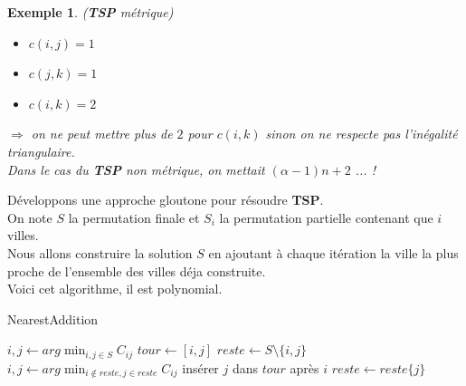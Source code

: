 \documentclass{article}
\newcommand{\titre}[1]{\textcolor{title}{#1}}
\newtheorem{exemple}{Exemple}[section]
\begin{document}
\begin{sffamily}
\begin{exemple}(\textbf{\titre{TSP}} métrique)
\begin{itemize}
\item $c(i,j) = 1$
\item $c(j,k) = 1$
\item $c(i,k) = 2$
\end{itemize}
$\Rightarrow$ on ne peut mettre plus de $2$ pour $c(i,k)$ sinon on ne respecte pas l'inégalité triangulaire.\\
Dans le cas du \textbf{\titre{TSP}} non métrique, on mettait $(\alpha-1)n+2$ ... !
\end{exemple}

Développons une approche gloutone pour résoudre \textbf{\titre{TSP}}.\\
On note $S$ la permutation finale et $S_i$ la permutation partielle contenant que $i$ villes.\\
Nous allons construire la solution $S$ en ajoutant à chaque itération la ville la plus proche de l'ensemble des villes déja construite.\\
Voici cet algorithme, il est polynomial.

\begin{algorithm}[h!]
\caption{NearestAddition}
\begin{algorithmic}[1]
\STATE $i,j \leftarrow arg\min_{i,j\in S} C_{ij}$
\STATE $tour \leftarrow [i,j]$
\STATE $reste \leftarrow S \setminus \{i,j\}$
\STATE $i,j \leftarrow arg\min_{i\not\in reste,j\in reste} C_{ij}$
\STATE insérer $j$ dans $tour$ après $i$
\STATE $reste\leftarrow reste\{j\}$
\ENDWHILE
\end{algorithmic}
\end{algorithm}


\end{sffamily}
\end{document}
